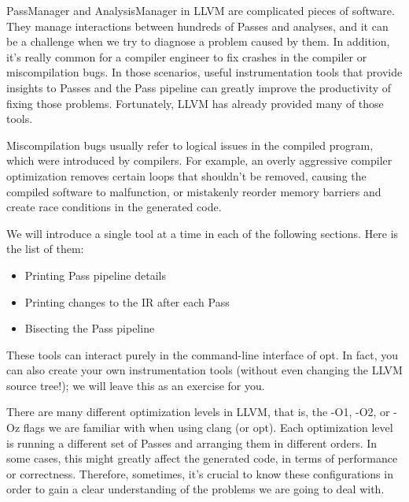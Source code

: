 
PassManager and AnalysisManager in LLVM are complicated pieces of software. They manage interactions between hundreds of Passes and analyses, and it can be a challenge when we try to diagnose a problem caused by them. In addition, it's really common for a compiler engineer to fix crashes in the compiler or miscompilation bugs. In those scenarios, useful instrumentation tools that provide insights to Passes and the Pass pipeline can greatly improve the productivity of fixing those problems. Fortunately, LLVM has already provided many of those tools.

\begin{tcolorbox}[colback=blue!5!white,colframe=blue!75!black, fonttitle=\bfseries,title=Miscompilation]	
\hspace*{0.7cm}Miscompilation bugs usually refer to logical issues in the compiled program, which were introduced by compilers. For example, an overly aggressive compiler optimization removes certain loops that shouldn't be removed, causing the compiled software to malfunction, or mistakenly reorder memory barriers and create race conditions in the generated code.
\end{tcolorbox}

We will introduce a single tool at a time in each of the following sections. Here is the list of them:

\begin{itemize}
\item Printing Pass pipeline details
\item Printing changes to the IR after each Pass
\item Bisecting the Pass pipeline
\end{itemize}

These tools can interact purely in the command-line interface of opt. In fact, you can also create your own instrumentation tools (without even changing the LLVM source tree!); we will leave this as an exercise for you.


There are many different optimization levels in LLVM, that is, the -O1, -O2, or -Oz flags we are familiar with when using clang (or opt). Each optimization level is running a different set of Passes and arranging them in different orders. In some cases, this might greatly affect the generated code, in terms of performance or correctness. Therefore, sometimes, it's crucial to know these configurations in order to gain a clear understanding of the problems we are going to deal with.

